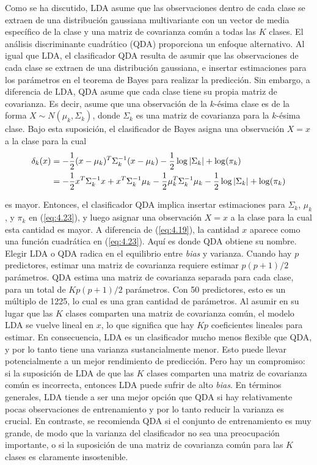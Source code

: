 Como se ha discutido, LDA asume que las observaciones dentro de cada clase se extraen de una distribución gaussiana multivariante con un vector de media específico de la clase y una matriz de covarianza común a todas las $K$ clases. El análisis discriminante cuadrático (QDA) proporciona un enfoque alternativo. Al igual que LDA, el clasificador QDA resulta de asumir que las observaciones de cada clase se extraen de una distribución gaussiana, e insertar estimaciones para los parámetros en el teorema de Bayes para realizar la predicción. Sin embargo, a diferencia de LDA, QDA asume que cada clase tiene su propia matriz de covarianza. Es decir, asume que una observación de la $k$-ésima clase es de la forma $X \sim N(\mu_k, \Sigma_k)$, donde $\Sigma_k$ es una matriz de covarianza para la $k$-ésima clase. Bajo esta suposición, el clasificador de Bayes asigna una observación $X = x$ a la clase para la cual
\begin{align}
\delta_k(x) &= - \frac{1}{2} (x - \mu_k)^T \Sigma_k^{-1} (x - \mu_k) -\frac{1}{2} \log|\Sigma_k| + \log(\pi_k) \notag \\
&= - \frac{1}{2} x^T \Sigma_k^{-1} x + x^T \Sigma_k^{-1} \mu_k - \frac{1}{2} \mu_k^T \Sigma_k^{-1} \mu_k - \frac{1}{2} \log|\Sigma_k| + \log(\pi_k)
\label{eq:4.23}
\end{align}

\noindent es mayor. Entonces, el clasificador QDA implica insertar estimaciones para $\Sigma_k$, $\mu_k$, y $\pi_k$ en (\ref{eq:4.23}), y luego asignar una observación $X = x$ a la clase para la cual esta cantidad es mayor. A diferencia de (\ref{eq:4.19}), la cantidad $x$ aparece como una función cuadrática en (\ref{eq:4.23}). Aquí es donde QDA obtiene su nombre. \\

Elegir LDA o QDA radica en el equilibrio entre \textit{bias} y varianza. Cuando hay $p$ predictores, estimar una matriz de covarianza requiere estimar $p(p+1)/2$ parámetros. QDA estima una matriz de covarianza separada para cada clase, para un total de $Kp(p+1)/2$ parámetros. Con 50 predictores, esto es un múltiplo de 1225, lo cual es una gran cantidad de parámetros. Al asumir en su lugar que las $K$ clases comparten una matriz de covarianza común, el modelo LDA se vuelve lineal en $x$, lo que significa que hay $Kp$ coeficientes lineales para estimar. En consecuencia, LDA es un clasificador mucho menos flexible que QDA, y por lo tanto tiene una varianza sustancialmente menor. Esto puede llevar potencialmente a un mejor rendimiento de predicción. Pero hay un compromiso: si la suposición de LDA de que las $K$ clases comparten una matriz de covarianza común es incorrecta, entonces LDA puede sufrir de alto \textit{bias}. En términos generales, LDA tiende a ser una mejor opción que QDA si hay relativamente pocas observaciones de entrenamiento y por lo tanto reducir la varianza es crucial. En contraste, se recomienda QDA si el conjunto de entrenamiento es muy grande, de modo que la varianza del clasificador no sea una preocupación importante, o si la suposición de una matriz de covarianza común para las $K$ clases es claramente insostenible. \\

